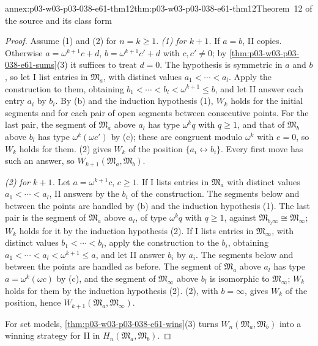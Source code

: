 \begin{annexitem}{annex:p03-w03-p03-038-e61-thm12}{thm:p03-w03-p03-038-e61-thm12}{Theorem~12 of the source and its class form}
\begin{proof}
Assume (1) and (2) for \(n=k\ge1\). \emph{(1) for \(k+1\).} If \(a=b\),
II copies. Otherwise \(a=\omega^{k+1}c+d\), \(b=\omega^{k+1}c'+d\) with
\(c,c'\ne0\); by \cref{thm:p03-w03-p03-038-e61-sums}(3) it suffices to
treat \(d=0\). The hypothesis is symmetric in \(a\) and \(b\), so let I
list entries in \(\mathfrak M_a\), with distinct values
\(a_1<\cdots<a_l\). Apply the construction to them, obtaining
\(b_1<\cdots<b_l<\omega^{k+1}\le b\), and let II answer each entry
\(a_i\) by \(b_i\). By (b) and the induction hypothesis (1), \(W_k\) holds
for the initial segments and for each pair of open segments between
consecutive points. For the last pair, the segment of \(\mathfrak M_a\)
above \(a_l\) has type \(\omega^kq\) with \(q\ge1\), and that of
\(\mathfrak M_b\) above \(b_l\) has type \(\omega^k(\omega c')\) by (c);
these are congruent modulo \(\omega^k\) with \(e=0\), so \(W_k\) holds
for them. (2) gives \(W_k\) of the
position \(\{a_i\leftrightarrow b_i\}\). Every first move has such an
answer, so \(W_{k+1}(\mathfrak M_a,\mathfrak M_b)\).

\emph{(2) for \(k+1\).} Let \(a=\omega^{k+1}c\), \(c\ge1\). If I lists
entries in \(\mathfrak M_a\) with distinct values \(a_1<\cdots<a_l\), II
answers by the \(b_i\) of the construction. The segments below and
between the points are handled by (b) and the induction hypothesis (1).
The last pair is the segment of \(\mathfrak M_a\) above \(a_l\), of type
\(\omega^kq\) with \(q\ge1\), against \(\mathfrak M_{b_l\infty}\cong
\mathfrak M_\infty\); \(W_k\) holds for it by the induction hypothesis (2).
If I lists entries in \(\mathfrak M_\infty\), with distinct values
\(b_1<\cdots<b_l\), apply the construction to the \(b_i\), obtaining
\(a_1<\cdots<a_l<\omega^{k+1}\le a\), and let II answer \(b_i\) by
\(a_i\). The segments below and between the points are handled as
before. The segment of \(\mathfrak M_a\) above \(a_l\) has type
\(a=\omega^k(\omega c)\) by (c), and the segment of
\(\mathfrak M_\infty\) above \(b_l\) is isomorphic to
\(\mathfrak M_\infty\); \(W_k\) holds for them by the induction hypothesis
(2). (2), with \(b=\infty\), gives
\(W_k\) of the position, hence \(W_{k+1}(\mathfrak M_a,
\mathfrak M_\infty)\).

For set models, \cref{thm:p03-w03-p03-038-e61-wins}(3) turns
\(W_n(\mathfrak M_a,\mathfrak M_b)\) into a winning strategy for II in
\(H_n(\mathfrak M_a,\mathfrak M_b)\).
\end{proof}
\end{annexitem}

